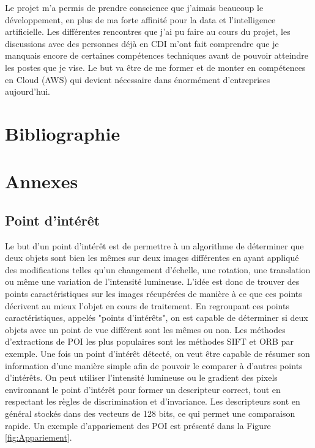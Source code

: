 \documentclass[11pt]{article}
\begin{document}
      Le projet m'a permis de prendre conscience que j'aimais beaucoup le développement, en plus de ma forte 
      affinité pour la data et l'intelligence artificielle. Les différentes rencontres que j'ai pu faire au 
      cours du projet, les discussions avec des personnes déjà en CDI m'ont fait comprendre que je manquais
      encore de certaines compétences techniques avant de pouvoir atteindre les postes que je vise.
      Le but va être de me former et de monter en compétences en Cloud (AWS) qui devient nécessaire dans 
      énormément d'entreprises aujourd'hui.

     

  \pagebreak
  
  \section{Bibliographie}

    \printbibliography[heading=none]

  \pagebreak
  
  \section{Annexes}

    \subsection*{Point d'intérêt}
      Le but d'un point d'intérêt est de permettre à un algorithme de déterminer que deux objets sont bien les mêmes sur deux images 
      différentes en ayant appliqué des modifications telles qu'un changement d'échelle, une rotation, une translation ou même une 
      variation de l'intensité lumineuse.
      L'idée est donc de trouver des points caractéristiques sur les images récupérées de manière à ce que ces points décrivent au mieux 
      l'objet en cours de traitement. En regroupant ces points caractéristiques, appelés "points d'intérêts", on est capable de déterminer 
      si deux objets avec un point de vue différent sont les mêmes ou non. Les méthodes d'extractions de POI les plus populaires 
      sont les méthodes SIFT et ORB par exemple.
      Une fois un point d'intérêt détecté, on veut être capable de résumer son information d'une manière simple afin de pouvoir le comparer
      à d'autres points d'intérêts. On peut utiliser l'intensité lumineuse ou le gradient des pixels environnant le point d'intérêt pour 
      former un descripteur correct, tout en respectant les règles de discrimination et d'invariance. Les descripteurs sont en général 
      stockés dans des vecteurs de 128 bits, ce qui permet une comparaison rapide.
      Un exemple d'appariement des POI est présenté dans la Figure \ref{fig:Appariement}. 
\end{document}
